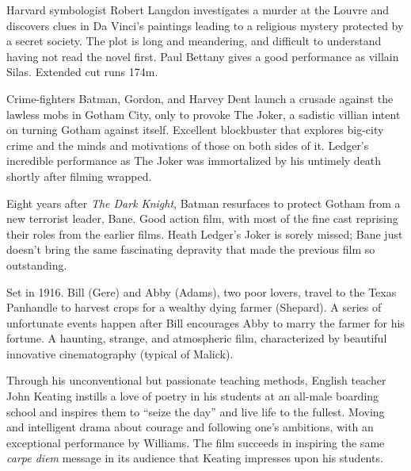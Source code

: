    Harvard symbologist Robert Langdon investigates a murder at the Louvre and discovers clues in Da Vinci's paintings leading to a religious mystery protected by a secret society. The plot is long and meandering, and difficult to understand having not read the novel first. Paul Bettany gives a good performance as villain Silas. Extended cut runs 174m. \author{DW} 

   Crime-fighters Batman, Gordon, and Harvey Dent launch a crusade against the lawless mobs in Gotham City, only to provoke The Joker, a sadistic villian intent on turning Gotham against itself. Excellent blockbuster that explores big-city crime and the minds and motivations of those on both sides of it. Ledger's incredible performance as The Joker was immortalized by his untimely death shortly after filming wrapped. \author{DW} 

   Eight years after \textit{The Dark Knight}, Batman resurfaces to protect Gotham from a new terrorist leader, Bane. Good action film, with most of the fine cast reprising their roles from the earlier films. Heath Ledger's Joker is sorely missed; Bane just doesn't bring the same fascinating depravity that made the previous film so outstanding. \author{DW} 

   Set in 1916. Bill (Gere) and Abby (Adams), two poor lovers, travel to the Texas Panhandle to harvest crops for a wealthy dying farmer (Shepard). A series of unfortunate events happen after Bill encourages Abby to marry the farmer for his fortune. A haunting, strange, and atmospheric film, characterized by beautiful innovative cinematography (typical of Malick). \author{AW} 

   Through his unconventional but passionate teaching methods, English teacher John Keating instills a love of poetry in his students at an all-male boarding school and inspires them to ``seize the day'' and live life to the fullest. Moving and intelligent drama about courage and following one's ambitions, with an exceptional performance by Williams. The film succeeds in inspiring the same \textit{carpe diem} message in its audience that Keating impresses upon his students. \author{DW} 

